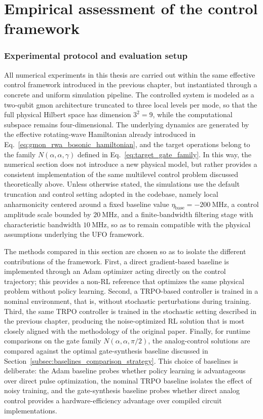 \chapter{Empirical assessment of the control framework}
\subsection{Experimental protocol and evaluation setup}
\label{subsec:experimental_protocol_setup}

All numerical experiments in this thesis are carried out within the same effective control framework introduced in the previous chapter, but instantiated through a concrete and uniform simulation pipeline. The controlled system is modeled as a two-qubit gmon architecture truncated to three local levels per mode, so that the full physical Hilbert space has dimension \(3^2=9\), while the computational subspace remains four-dimensional. The underlying dynamics are generated by the effective rotating-wave Hamiltonian already introduced in Eq.~\eqref{eq:gmon_rwa_bosonic_hamiltonian}, and the target operations belong to the family \(N(\alpha,\alpha,\gamma)\) defined in Eq.~\eqref{eq:target_gate_family}. In this way, the numerical section does not introduce a new physical model, but rather provides a consistent implementation of the same multilevel control problem discussed theoretically above. Unless otherwise stated, the simulations use the default truncation and control setting adopted in the codebase, namely local anharmonicity centered around a fixed baseline value \(\eta_{\mathrm{base}}=-200~\mathrm{MHz}\), a control amplitude scale bounded by \(20~\mathrm{MHz}\), and a finite-bandwidth filtering stage with characteristic bandwidth \(10~\mathrm{MHz}\), so as to remain compatible with the physical assumptions underlying the UFO framework.

The methods compared in this section are chosen so as to isolate the different contributions of the framework. First, a direct gradient-based baseline is implemented through an Adam optimizer acting directly on the control trajectory; this provides a non-RL reference that optimizes the same physical problem without policy learning. Second, a TRPO-based controller is trained in a nominal environment, that is, without stochastic perturbations during training. Third, the same TRPO controller is trained in the stochastic setting described in the previous chapter, producing the noise-optimized RL solution that is most closely aligned with the methodology of the original paper. Finally, for runtime comparisons on the gate family \(N(\alpha,\alpha,\pi/2)\), the analog-control solutions are compared against the optimal gate-synthesis baseline discussed in Section~\ref{subsec:baselines_comparison_strategy}. This choice of baselines is deliberate: the Adam baseline probes whether policy learning is advantageous over direct pulse optimization, the nominal TRPO baseline isolates the effect of noisy training, and the gate-synthesis baseline probes whether direct analog control provides a hardware-efficiency advantage over compiled circuit implementations.

